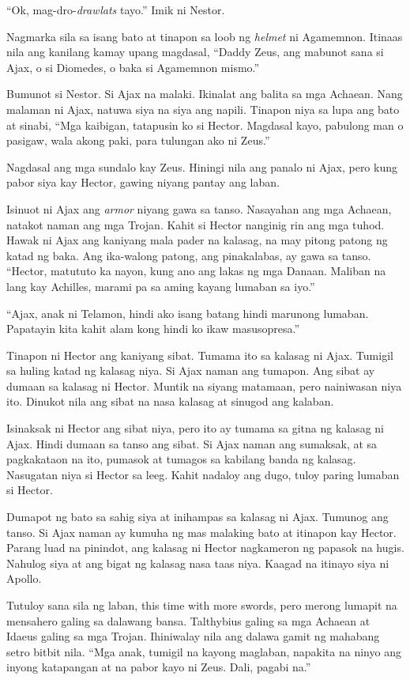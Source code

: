 \documentclass[12pt,letterpaper]{report}
\begin{document}
``Ok, mag-dro-\textit{drawlats} tayo.'' Imik ni Nestor.

Nagmarka sila sa isang bato at tinapon sa loob ng \textit{helmet} ni Agamemnon. Itinaas nila ang kanilang kamay upang magdasal, ``Daddy Zeus, ang mabunot sana si Ajax, o si Diomedes, o baka si Agamemnon mismo.''

Bumunot si Nestor. Si Ajax na malaki. Ikinalat ang balita sa mga Achaean. Nang malaman ni Ajax, natuwa siya na siya ang napili. Tinapon niya sa lupa ang bato at sinabi, ``Mga kaibigan, tatapusin ko si Hector. Magdasal kayo, pabulong  man o pasigaw, wala akong paki, para tulungan ako ni Zeus.''

Nagdasal ang mga sundalo kay Zeus. Hiningi nila ang panalo ni Ajax, pero kung pabor siya kay Hector, gawing niyang pantay ang laban. 

Isinuot ni Ajax ang \textit{armor} niyang gawa sa tanso. Nasayahan ang mga Achaean, natakot naman ang mga Trojan. Kahit si Hector nanginig rin ang mga tuhod. Hawak ni Ajax ang kaniyang mala pader na kalasag, na may pitong patong ng katad ng baka. Ang ika-walong patong, ang pinakalabas, ay gawa sa tanso. ``Hector, matututo ka nayon, kung ano ang lakas ng mga Danaan. Maliban na lang kay Achilles, marami pa sa aming kayang lumaban sa iyo.''

``Ajax, anak ni Telamon, hindi ako isang batang hindi marunong lumaban. Papatayin kita kahit alam kong hindi ko ikaw masusopresa.''

Tinapon ni Hector ang kaniyang sibat. Tumama ito sa kalasag ni Ajax. Tumigil sa huling katad ng kalasag niya. Si Ajax naman ang tumapon. Ang sibat ay dumaan sa kalasag ni Hector. Muntik na siyang matamaan, pero nainiwasan niya ito. Dinukot nila ang sibat na nasa kalasag at sinugod ang kalaban.

Isinaksak ni Hector ang sibat niya, pero ito ay tumama sa gitna ng kalasag ni Ajax. Hindi dumaan sa tanso ang sibat. Si Ajax naman ang sumaksak, at sa pagkakataon na ito, pumasok at tumagos sa kabilang banda ng kalasag. Nasugatan niya si Hector sa leeg. Kahit nadaloy ang dugo, tuloy paring lumaban si Hector.

Dumapot ng bato sa sahig siya at inihampas sa kalasag ni Ajax. Tumunog ang tanso. Si Ajax naman ay kumuha ng mas malaking bato at itinapon kay Hector. Parang luad na pinindot, ang kalasag ni Hector nagkameron ng papasok na hugis. Nahulog siya at ang bigat ng kalasag nasa taas niya. Kaagad na itinayo siya ni Apollo.

Tutuloy sana sila ng laban, this time with more swords, pero merong lumapit na mensahero galing sa dalawang bansa. Talthybius galing sa mga Achaean at Idaeus galing sa mga Trojan. Ihiniwalay nila ang dalawa gamit ng mahabang setro bitbit nila. ``Mga anak, tumigil na kayong maglaban, napakita na ninyo ang inyong katapangan at na pabor kayo ni Zeus. Dali, pagabi na.''
\end{document}
